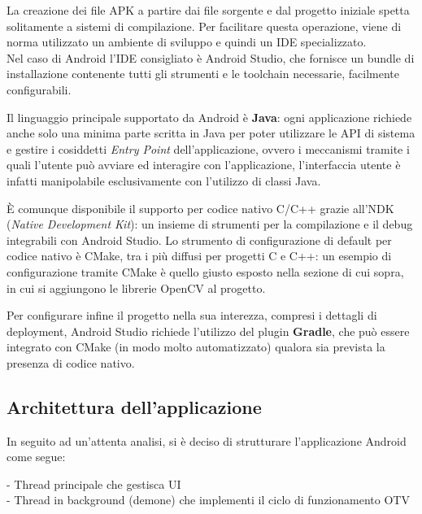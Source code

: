 La creazione dei file APK a partire dai file sorgente e dal progetto iniziale spetta solitamente a sistemi di compilazione.
Per facilitare questa operazione, viene di norma utilizzato un ambiente di sviluppo e quindi un IDE specializzato.\\
Nel caso di Android l'IDE consigliato è Android Studio, che fornisce un bundle di installazione contenente tutti gli strumenti
e le toolchain necessarie, facilmente configurabili.

Il linguaggio principale supportato da Android è \textbf{Java}: ogni applicazione richiede anche solo una minima parte scritta 
in Java per poter utilizzare le API di sistema e gestire i cosiddetti \emph{Entry Point} dell'applicazione, ovvero i meccanismi 
tramite i quali l'utente può avviare ed interagire con l'applicazione, l'interfaccia utente è infatti manipolabile esclusivamente
con l'utilizzo di classi Java.

È comunque disponibile il supporto per codice nativo C/C++ grazie all'NDK (\emph{Native Development Kit}): un insieme di strumenti
per la compilazione e il debug integrabili con Android Studio. Lo strumento di configurazione di default per codice nativo è 
CMake, tra i più diffusi per progetti C e C++: un esempio di configurazione tramite CMake è quello giusto esposto nella
sezione di cui sopra, in cui si aggiungono le librerie OpenCV al progetto.

Per configurare infine il progetto nella sua interezza, compresi i dettagli di deployment, Android Studio richiede l'utilizzo 
del plugin \textbf{Gradle}, che può essere integrato con CMake (in modo molto automatizzato) qualora sia prevista la 
presenza di codice nativo.

\subsection{Architettura dell'applicazione}

In seguito ad un'attenta analisi, si è deciso di strutturare l'applicazione Android come segue:

- Thread principale che gestisca UI\\
- Thread in background (demone) che implementi il ciclo di funzionamento OTV


